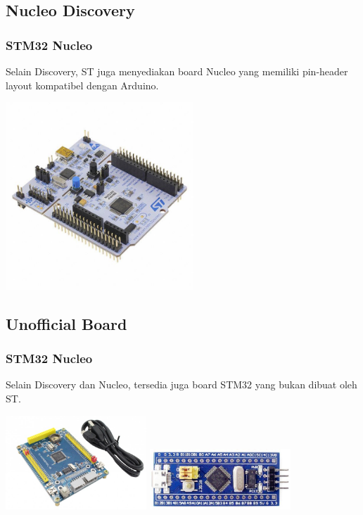 \documentclass[table,dvipsnames]{beamer}
\begin{document}
	\subsection{Nucleo Discovery}
	\begin{frame}
		\frametitle{STM32 Nucleo}
		\begin{block}{}
			Selain Discovery, ST juga menyediakan board Nucleo yang memiliki pin-header layout
			kompatibel dengan Arduino.
		\end{block}
		
		\begin{center}
			\includegraphics[width=200pt]{images/nucleo}
		\end{center}
	\end{frame}

	\subsection{Unofficial Board}
	\begin{frame}
		\frametitle{STM32 Nucleo}
		\begin{block}{}
			Selain Discovery dan Nucleo, tersedia juga board STM32 yang bukan dibuat oleh ST.
		\end{block}
		
		\begin{center}
			\includegraphics[width=150pt]{images/czmini}
			\includegraphics[width=150pt]{images/bluepill}
		\end{center}
	\end{frame}
\end{document}
